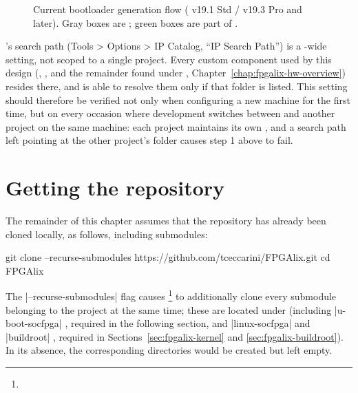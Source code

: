 \begin{figure}[htbp]
    \centering
    
    \caption{Current bootloader generation flow ( v19.1 Std / v19.3 Pro and later). Gray boxes are ; green boxes are part of .}
    \label{fig:fpgalix-boot-generation-flow}
\end{figure}

\begin{warningbox}
    's  search path (Tools > Options > IP Catalog, ``IP Search Path'') is a -wide setting, not scoped to a single project. Every custom component used by this design (, , and the remainder found under , Chapter~\ref{chap:fpgalix-hw-overview}) resides there, and  is able to resolve them only if that folder is listed. This setting should therefore be verified not only when configuring a new machine for the first time, but on every occasion where development switches between  and another  project on the same machine: each project maintains its own , and a search path left pointing at the other project's folder causes step 1 above to fail.
\end{warningbox}

\section{Getting the repository}

The remainder of this chapter assumes that the  repository has already been cloned locally, as follows, including submodules:

\begin{shellcodehost}
git clone --recurse-submodules https://github.com/tceccarini/FPGAlix.git
cd FPGAlix
\end{shellcodehost}

The |--recurse-submodules| flag causes \footnote{} to additionally clone every submodule belonging to the project at the same time; these are located under  (including |u-boot-socfpga| \cite{SUB-UBOOT}, required in the following section, and |linux-socfpga| \cite{SUB-LINUX} and |buildroot| \cite{SUB-BUILDROOT}, required in Sections~\ref{sec:fpgalix-kernel} and \ref{sec:fpgalix-buildroot}). In its absence, the corresponding directories would be created but left empty.

